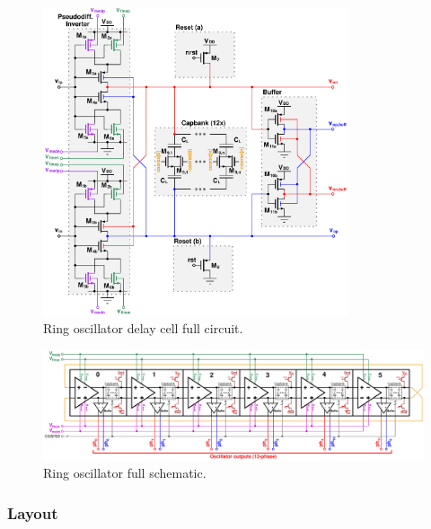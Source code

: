 			\begin{figure}[htb!]
			        \centering
			        \includegraphics[width=0.8\textwidth, angle=0]{./figs/design/delay_cell_full}
			    \caption{Ring oscillator delay cell full circuit.}
			    \label{fig:delay_cell_circuit}
			\end{figure}
			\begin{figure}[htb!]
			        \centering
			        \includegraphics[width=1.5\textwidth, angle=90]{./figs/design/rosc_full_6stg}
			    \caption{Ring oscillator full schematic.}
			    \label{fig:full_6sg_ro}
			\end{figure}

		\subsubsection{Layout}
	\FloatBarrier
